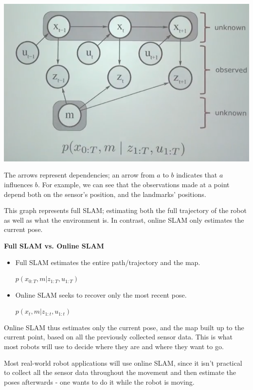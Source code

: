 \documentclass[a4paper]{article}
\begin{document}
\begin{center}
\includegraphics[scale=0.5]{graph-mod}
\end{center}

The arrows represent dependencies; an arrow from $a$ to $b$ indicates that $a$ influences $b$. For example,  we can see that the observations made at a point depend both on the sensor's position, and the landmarks' positions.

This graph represents full SLAM; estimating both the full trajectory of the robot as well as what the environment is. In contrast, online SLAM only estimates the current pose.

\textbf{Full SLAM vs. Online SLAM}

\begin{itemize}

    \item Full SLAM estimates the entire path/trajectory and the map.
    
    $p(x_{0:T}, m | z_{1:T}, u_{1:T})$
    
    \item Online SLAM seeks to recover only the most recent pose.
    
    $p(x_{t}, m | z_{1:t}, u_{1:t})$
    
\end{itemize}

Online SLAM thus estimates only the current pose, and the map built up to the current point, based on all the previously collected sensor data. This is what most robots will use to decide where they are and where they want to go.

Most real-world robot applications will use online SLAM, since it isn't practical to collect all the sensor data throughout the movement and then estimate the poses afterwards - one wants to do it while the robot is moving.
\end{document}
